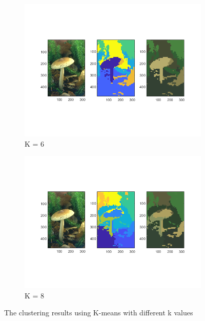 \documentclass[12pt]{article}
\begin{document}
\begin{figure}[H]
\begin{subfigure}[b]{0.475\textwidth}
		\centering 
		\includegraphics[width=\textwidth]{figs/2-b-kmeans-1-k6}
		\caption[]%
		{{\small  K = 6}}    
		\label{fig:mean and std of net34}
	\end{subfigure}
	\quad
	\begin{subfigure}[b]{0.475\textwidth}   
		\centering 
		\includegraphics[width=\textwidth]{figs/2-b-kmeans-1-k8}
		\caption[]%
		{{\small  K = 8}}    
		\label{fig:mean and std of net44}
	\end{subfigure}
	\caption[]
	{\small The clustering results using K-means with different k values} 
	\label{fig:mean and std of nets}
\end{figure}
\end{document}
